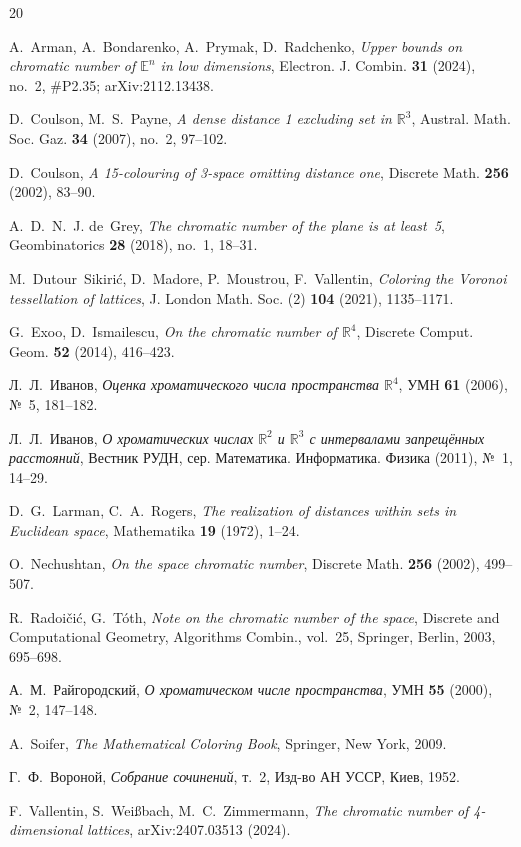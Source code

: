 \documentclass[12pt]{article}
\theoremstyle{definition}
\theoremstyle{remark}
\newcommand{\R}{\mathbb{R}}
\newcommand{\E}{\mathbb{E}}
\begin{document}
\begin{thebibliography}{20}

A.~Arman, A.~Bondarenko, A.~Prymak, D.~Radchenko,
\emph{Upper bounds on chromatic number of $\E^n$ in low dimensions},
Electron. J. Combin. \textbf{31} (2024), no.~2, \#P2.35;
arXiv:2112.13438.

D.~Coulson, M.~S.~Payne,
\emph{A dense distance 1 excluding set in $\R^3$},
Austral. Math. Soc. Gaz. \textbf{34} (2007), no.~2, 97--102.

D.~Coulson,
\emph{A 15-colouring of 3-space omitting distance one},
Discrete Math. \textbf{256} (2002), 83--90.

A.~D.~N.~J. de~Grey,
\emph{The chromatic number of the plane is at least~5},
Geombinatorics \textbf{28} (2018), no.~1, 18--31.

M.~Dutour~Sikiri\'c, D.~Madore, P.~Moustrou, F.~Vallentin,
\emph{Coloring the Voronoi tessellation of lattices},
J. London Math. Soc. (2) \textbf{104} (2021), 1135--1171.

G.~Exoo, D.~Ismailescu,
\emph{On the chromatic number of $\R^4$},
Discrete Comput. Geom. \textbf{52} (2014), 416--423.

Л.~Л.~Иванов,
\emph{Оценка хроматического числа пространства $\R^4$},
УМН \textbf{61} (2006), №~5, 181--182.

Л.~Л.~Иванов,
\emph{О хроматических числах $\R^2$ и $\R^3$ с интервалами запрещённых
расстояний},
Вестник РУДН, сер. Математика. Информатика. Физика (2011), №~1, 14--29.

D.~G.~Larman, C.~A.~Rogers,
\emph{The realization of distances within sets in Euclidean space},
Mathematika \textbf{19} (1972), 1--24.

O.~Nechushtan,
\emph{On the space chromatic number},
Discrete Math. \textbf{256} (2002), 499--507.

R.~Radoi\v{c}i\'c, G.~T\'oth,
\emph{Note on the chromatic number of the space},
Discrete and Computational Geometry, Algorithms Combin., vol.~25,
Springer, Berlin, 2003, 695--698.

А.~М.~Райгородский,
\emph{О хроматическом числе пространства},
УМН \textbf{55} (2000), №~2, 147--148.

A.~Soifer,
\emph{The Mathematical Coloring Book},
Springer, New York, 2009.

Г.~Ф.~Вороной,
\emph{Собрание сочинений}, т.~2,
Изд-во АН УССР, Киев, 1952.

F.~Vallentin, S.~Wei\ss bach, M.~C.~Zimmermann,
\emph{The chromatic number of 4-dimensional lattices},
arXiv:2407.03513 (2024).

\end{thebibliography}
\end{document}
